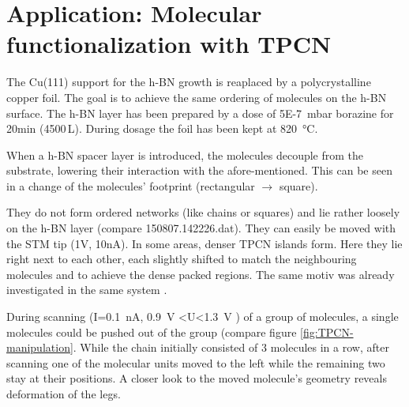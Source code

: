   \section{Application: Molecular functionalization with TPCN}
  The Cu(111) support for the h-BN growth is reaplaced by a polycrystalline copper foil. The goal is to achieve the same ordering of molecules on the h-BN surface. The h-BN layer has been prepared by a dose of \SI{5E-7}{\milli\bar} borazine for 20min (4500\,L). During dosage the foil has been kept at \SI{820}{\degreeCelsius}.
  
  When a h-BN spacer layer is introduced, the molecules decouple from the substrate, lowering their interaction with the afore-mentioned. This can be seen in a change of the molecules' footprint (rectangular $\rightarrow$ square).
  
  They do not form ordered networks (like chains or squares) and lie rather loosely on the h-BN layer (compare 150807.142226.dat). They can easily be moved with the STM tip (1V, 10nA). In some areas, denser TPCN islands form. Here they lie right next to each other, each slightly shifted to match the neighbouring molecules and to achieve the dense packed regions. The same motiv was already investigated in the same system \cite{urgel_controlling_2015}.
  
  During scanning (I=\SI{0.1}{\nA}, \SI{0.9}{\V} <U<\SI{1.3}{\V} ) of a group of molecules, a single molecules could be pushed out of the group (compare figure \ref{fig:TPCN-manipulation}. While the chain initially consisted of 3 molecules in a row, after scanning one of the molecular units moved to the left while the remaining two stay at their positions. A closer look to the moved molecule's geometry reveals deformation of the legs.
  
